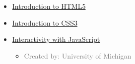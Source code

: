 \begin{multicols}{2}
\begin{itemize}
	\item  {} \href{https://www.coursera.org/learn/html}{Introduction to HTML5} 
	
	\item  {} \href{https://www.coursera.org/learn/introcss}{Introduction to CSS3} 
	
	\item  {} \href{https://www.coursera.org/learn/javascript}{Interactivity with JavaScript}  
	\begin{itemize}
		\item \textcolor{gray}{Created by: University of Michigan}
	\end{itemize}

\end{itemize}
\end{multicols}


